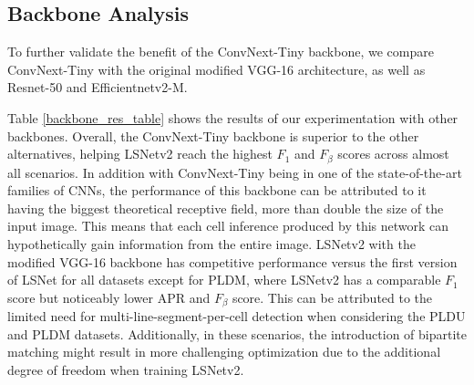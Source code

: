 \documentclass[journal]{IEEEtran}
\begin{document}
\subsection{Backbone Analysis}

To further validate the benefit of the ConvNext-Tiny backbone, we compare ConvNext-Tiny with the original modified VGG-16 architecture, as well as Resnet-50 and Efficientnetv2-M.

Table \ref{backbone_res_table} shows the results of our experimentation with other backbones. Overall, the ConvNext-Tiny backbone is superior to the other alternatives, helping LSNetv2 reach the highest $F_1$ and $F_\beta$ scores across almost all scenarios. In addition with ConvNext-Tiny being in one of the state-of-the-art families of CNNs, the performance of this backbone can be attributed to it having the biggest theoretical receptive field, more than double the size of the input image. This means that each cell inference produced by this network can hypothetically gain information from the entire image.  LSNetv2 with the modified VGG-16 backbone has competitive performance versus the first version of LSNet for all datasets except for PLDM, where LSNetv2 has a comparable $F_1$ score but noticeably lower APR and $F_{\beta}$ score. This can be attributed to the limited need for multi-line-segment-per-cell detection when considering the PLDU and PLDM datasets. Additionally, in these scenarios, the introduction of bipartite matching might result in more challenging optimization due to the additional degree of freedom when training LSNetv2.%
\end{document}
